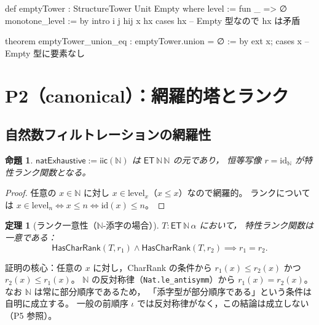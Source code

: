 \documentclass[a4paper,11pt]{ltjsarticle}
\theoremstyle{definition}
\theoremstyle{plain}
\newtheorem{theorem}[definition]{定理}
\newtheorem{proposition}[definition]{命題}
\theoremstyle{remark}
\newcommand{\ET}{\mathsf{ET}}    %
\newcommand{\lev}{\mathrm{level}}
\begin{document}
\begin{leancode}[caption={空の塔と基本定理（P1: trivial）}]
def emptyTower : StructureTower Unit Empty where
  level := fun _ => ∅
  monotone_level := by
    intro i j hij x hx
    cases hx  -- Empty 型なので hx は矛盾

theorem emptyTower_union_eq :
    emptyTower.union = ∅ := by
  ext x; cases x  -- Empty 型に要素なし
\end{leancode}

\section{P2（canonical）：網羅的塔とランク}\label{sec:exhaustive}

\subsection{自然数フィルトレーションの網羅性}

\begin{proposition}
$\mathsf{natExhaustive} := \mathsf{iic}(\mathbb{N})$ は $\ET\,\mathbb{N}\,\mathbb{N}$ の元であり，
恒等写像 $r = \mathrm{id}_\mathbb{N}$ が特性ランク関数となる。
\end{proposition}
\begin{proof}
任意の $x \in \mathbb{N}$ に対し $x \in \lev_x$（$x \leq x$）なので網羅的。
ランクについては $x \in \lev_n \iff x \leq n \iff \mathrm{id}(x) \leq n$。
\end{proof}

\begin{theorem}[ランク一意性（$\mathbb{N}$-添字の場合）]\label{thm:rank-unique}
$T : \ET\,\mathbb{N}\,\alpha$ において，
特性ランク関数は一意である：
\[
  \mathsf{HasCharRank}(T, r_1) \wedge \mathsf{HasCharRank}(T, r_2) \implies r_1 = r_2.
\]
\end{theorem}

\begin{mathinsight}
証明の核心：任意の $x$ に対し，CharRank の条件から
$r_1(x) \leq r_2(x)$ かつ $r_2(x) \leq r_1(x)$。
$\mathbb{N}$ の反対称律（\texttt{Nat.le\_antisymm}）から $r_1(x) = r_2(x)$。
なお $\mathbb{N}$ は常に部分順序であるため，
「添字型が部分順序である」という条件は自明に成立する。
一般の前順序 $\iota$ では反対称律がなく，この結論は成立しない（P5 参照）。
\end{mathinsight}
\end{document}
